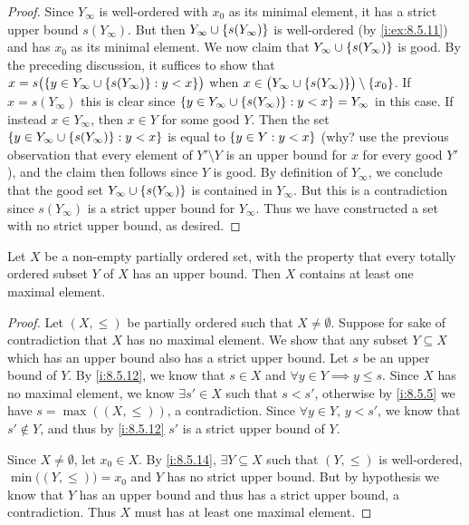 \begin{proof}
  Since \(Y_{\infty}\) is well-ordered with \(x_0\) as its minimal element, it has a strict upper bound \(s(Y_{\infty})\).
  But then \(Y_{\infty} \cup \left\lbrace s(Y_{\infty})\right\rbrace\) is well-ordered (by \cref{i:ex:8.5.11}) and has \(x_0\) as its minimal element.
  We now claim that \(Y_{\infty} \cup \left\lbrace s(Y_{\infty})\right\rbrace\) is good.
  By the preceding discussion, it suffices to show that \(x = s\big(\set{y \in Y_{\infty} \cup \set{s(Y_{\infty})} : y < x}\big)\) when \(x \in \big(Y_{\infty} \cup \set{s(Y_{\infty})}\big) \setminus \set{x_0}\).
  If \(x = s(Y_{\infty})\) this is clear since \(\left\lbrace y \in Y_{\infty} \cup \left\lbrace s(Y_{\infty})\right\rbrace : y < x\right\rbrace = Y_{\infty}\) in this case.
  If instead \(x \in Y_{\infty}\), then \(x \in Y\) for some good \(Y\).
  Then the set \(\left\lbrace y \in Y_{\infty} \cup \left\lbrace s(Y_{\infty})\right\rbrace: y < x\right\rbrace\) is equal to \(\left\lbrace y \in Y : y < x\right\rbrace\)
  (why? use the previous observation that every element of \(Y' \setminus Y\) is an upper bound for \(x\) for every good \(Y'\)), and the claim then follows since \(Y\) is good.
  By definition of \(Y_{\infty}\), we conclude that the good set \(Y_{\infty} \cup \left\lbrace s(Y_{\infty})\right\rbrace\) is contained in \(Y_{\infty}\).
  But this is a contradiction since \(s(Y_{\infty})\) is a strict upper bound for \(Y_{\infty}\).
  Thus we have constructed a set with no strict upper bound, as desired.
\end{proof}

\begin{lem}\label{i:8.5.15}
  Let \(X\) be a non-empty partially ordered set, with the property that every totally ordered subset \(Y\) of \(X\) has an upper bound.
  Then \(X\) contains at least one maximal element.
\end{lem}

\begin{proof}
  Let \((X, \leq)\) be partially ordered such that \(X \neq \emptyset\).
  Suppose for sake of contradiction that \(X\) has no maximal element.
  We show that any subset \(Y \subseteq X\) which has an upper bound also has a strict upper bound.
  Let \(s\) be an upper bound of \(Y\).
  By \cref{i:8.5.12}, we know that \(s \in X\) and \(\forall y \in Y \implies y \leq s\).
  Since \(X\) has no maximal element, we know \(\exists s' \in X\) such that \(s < s'\), otherwise by \cref{i:8.5.5} we have \(s = \max((X, \leq))\), a contradiction.
  Since \(\forall y \in Y\), \(y < s'\), we know that \(s' \notin Y\), and thus by \cref{i:8.5.12} \(s'\) is a strict upper bound of \(Y\).

  Since \(X \neq \emptyset\), let \(x_0 \in X\).
  By \cref{i:8.5.14}, \(\exists Y \subseteq X\) such that \((Y, \leq)\) is well-ordered, \(\min\big((Y, \leq)\big) = x_0\) and \(Y\) has no strict upper bound.
  But by hypothesis we know that \(Y\) has an upper bound and thus has a strict upper bound, a contradiction.
  Thus \(X\) must has at least one maximal element.
\end{proof}

